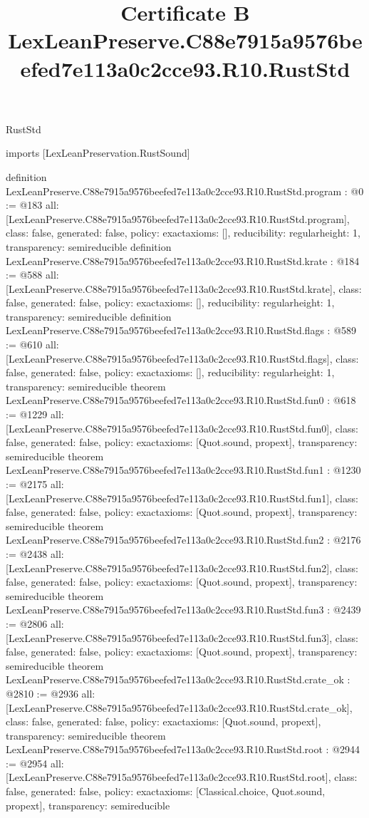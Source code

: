 \begin{lexlean}{RustStd}
\title{Certificate B LexLeanPreserve.C88e7915a9576beefed7e113a0c2cce93.R10.RustStd}
\begin{coremodule}
imports [LexLeanPreservation.RustSound]

definition LexLeanPreserve.C88e7915a9576beefed7e113a0c2cce93.R10.RustStd.program : @0 := @183 {
  all: [LexLeanPreserve.C88e7915a9576beefed7e113a0c2cce93.R10.RustStd.program],
  class: false,
  generated: false,
  policy: exact{axioms: []},
  reducibility: regular{height: 1},
  transparency: semireducible
}
definition LexLeanPreserve.C88e7915a9576beefed7e113a0c2cce93.R10.RustStd.krate : @184 := @588 {
  all: [LexLeanPreserve.C88e7915a9576beefed7e113a0c2cce93.R10.RustStd.krate],
  class: false,
  generated: false,
  policy: exact{axioms: []},
  reducibility: regular{height: 1},
  transparency: semireducible
}
definition LexLeanPreserve.C88e7915a9576beefed7e113a0c2cce93.R10.RustStd.flags : @589 := @610 {
  all: [LexLeanPreserve.C88e7915a9576beefed7e113a0c2cce93.R10.RustStd.flags],
  class: false,
  generated: false,
  policy: exact{axioms: []},
  reducibility: regular{height: 1},
  transparency: semireducible
}
theorem LexLeanPreserve.C88e7915a9576beefed7e113a0c2cce93.R10.RustStd.fun0 : @618 := @1229 {
  all: [LexLeanPreserve.C88e7915a9576beefed7e113a0c2cce93.R10.RustStd.fun0],
  class: false,
  generated: false,
  policy: exact{axioms: [Quot.sound, propext]},
  transparency: semireducible
}
theorem LexLeanPreserve.C88e7915a9576beefed7e113a0c2cce93.R10.RustStd.fun1 : @1230 := @2175 {
  all: [LexLeanPreserve.C88e7915a9576beefed7e113a0c2cce93.R10.RustStd.fun1],
  class: false,
  generated: false,
  policy: exact{axioms: [Quot.sound, propext]},
  transparency: semireducible
}
theorem LexLeanPreserve.C88e7915a9576beefed7e113a0c2cce93.R10.RustStd.fun2 : @2176 := @2438 {
  all: [LexLeanPreserve.C88e7915a9576beefed7e113a0c2cce93.R10.RustStd.fun2],
  class: false,
  generated: false,
  policy: exact{axioms: [Quot.sound, propext]},
  transparency: semireducible
}
theorem LexLeanPreserve.C88e7915a9576beefed7e113a0c2cce93.R10.RustStd.fun3 : @2439 := @2806 {
  all: [LexLeanPreserve.C88e7915a9576beefed7e113a0c2cce93.R10.RustStd.fun3],
  class: false,
  generated: false,
  policy: exact{axioms: [Quot.sound, propext]},
  transparency: semireducible
}
theorem LexLeanPreserve.C88e7915a9576beefed7e113a0c2cce93.R10.RustStd.crate_ok : @2810 := @2936 {
  all: [LexLeanPreserve.C88e7915a9576beefed7e113a0c2cce93.R10.RustStd.crate_ok],
  class: false,
  generated: false,
  policy: exact{axioms: [Quot.sound, propext]},
  transparency: semireducible
}
theorem LexLeanPreserve.C88e7915a9576beefed7e113a0c2cce93.R10.RustStd.root : @2944 := @2954 {
  all: [LexLeanPreserve.C88e7915a9576beefed7e113a0c2cce93.R10.RustStd.root],
  class: false,
  generated: false,
  policy: exact{axioms: [Classical.choice, Quot.sound, propext]},
  transparency: semireducible
}


\end{coremodule}
\end{lexlean}
